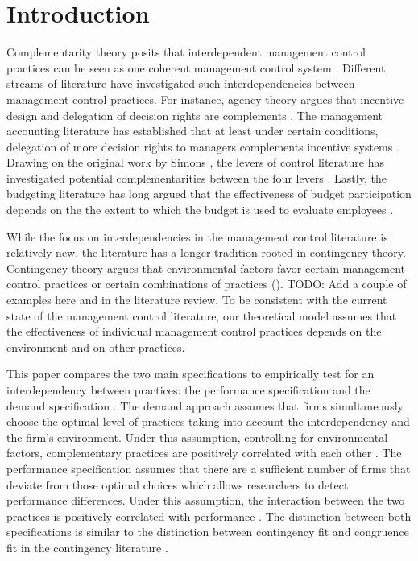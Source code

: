 \documentclass[12pt]{article}
\begin{document}
\section{Introduction}\label{introduction}

 Complementarity theory posits that interdependent management control practices can be seen as one coherent management control system \citep{Milgrom1995, Grabner2013}. Different streams of literature have investigated such interdependencies between management control practices. For instance, agency theory argues that incentive design and delegation of decision rights are complements \citep{Holmstrom1994}. The management accounting literature has established that at least under certain conditions, delegation of more decision rights to managers complements incentive systems \citep{Moers2006, Indjejikian2012, Bouwens2007}. Drawing on the original work by Simons \citetext{\citeyear{Simons1995}; \citeyear{Simons2000}}, the levers of control literature has investigated potential complementarities between the four levers \citep{Widener2007}. Lastly, the budgeting literature has long argued that the effectiveness of budget participation depends on the the extent to which the budget is used to evaluate employees \citep{Brownell1991, Dunk1993}.
 
While the focus on interdependencies in the management control literature is relatively new, the literature has a longer tradition rooted in contingency theory.  Contingency theory argues that environmental factors favor certain management control practices or certain combinations of practices (\citet{Grabner2013,Chenhall2003}). TODO: Add a couple of examples here and in the literature review. To be consistent with the current state of the management control literature, our theoretical model assumes that the effectiveness of individual management control practices depends on the environment and on other practices.
 
This paper compares the two main specifications to empirically test for an interdependency between practices: the performance specification and the demand specification \citep{Grabner2013}. The demand approach assumes that firms simultaneously choose the optimal level of practices taking into account the interdependency and the firm's environment. Under this assumption, controlling for environmental factors, complementary practices are positively correlated with each other \citep{Arora1996,Grabner2013,hofmann2017organizational,Johansson2018}. The performance specification assumes that there are a sufficient number of firms that deviate from those optimal choices which allows researchers to detect performance differences. Under this assumption, the interaction between the two practices is positively correlated with performance \citep{Athey1998,Carree2011, Grabner2013, hofmann2017organizational}. The distinction between both specifications is similar to the distinction between contingency fit and congruence fit in the contingency literature \citep{VandeVen1985a, Gerdin2004}. 
\end{document}

